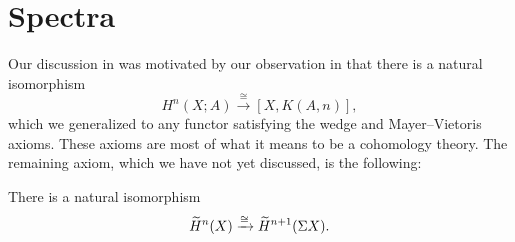



\section{Spectra}

Our discussion in  was motivated by our observation in  that there is a natural isomorphism \[H^n(X; A) \xrightarrow\cong [X, K(A, n)],\] which we generalized to any functor satisfying the wedge and Mayer--Vietoris axioms.
These axioms are most of what it means to be a cohomology theory.
The remaining axiom, which we have not yet discussed, is the following:

\begin{definition}
There is a natural isomorphism
\[\widetilde H^n(X) \xrightarrow\cong \widetilde H^{n+1}(\Sigma X).\]
\end{definition}

